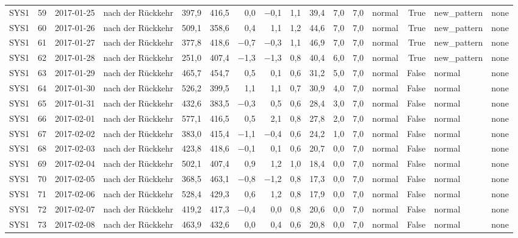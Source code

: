 \begin{tabular}{lrllrrrrrrrrlrll}
SYS1 & 59 & 2017-01-25 & nach der Rückkehr & 397,9 & 416,5 & 0,0 & $-$0,1 & 1,1 & 39,4 & 7,0 & 7,0 & normal & True & new\_pattern & none \\
SYS1 & 60 & 2017-01-26 & nach der Rückkehr & 509,1 & 358,6 & 0,4 & 1,1 & 1,2 & 44,6 & 7,0 & 7,0 & normal & True & new\_pattern & none \\
SYS1 & 61 & 2017-01-27 & nach der Rückkehr & 377,8 & 418,6 & $-$0,7 & $-$0,3 & 1,1 & 46,9 & 7,0 & 7,0 & normal & True & new\_pattern & none \\
SYS1 & 62 & 2017-01-28 & nach der Rückkehr & 251,0 & 407,4 & $-$1,3 & $-$1,3 & 0,8 & 40,4 & 6,0 & 7,0 & normal & True & new\_pattern & none \\
SYS1 & 63 & 2017-01-29 & nach der Rückkehr & 465,7 & 454,7 & 0,5 & 0,1 & 0,6 & 31,2 & 5,0 & 7,0 & normal & False & normal & none \\
SYS1 & 64 & 2017-01-30 & nach der Rückkehr & 526,2 & 399,5 & 1,1 & 1,1 & 0,7 & 30,9 & 4,0 & 7,0 & normal & False & normal & none \\
SYS1 & 65 & 2017-01-31 & nach der Rückkehr & 432,6 & 383,5 & $-$0,3 & 0,5 & 0,6 & 28,4 & 3,0 & 7,0 & normal & False & normal & none \\
SYS1 & 66 & 2017-02-01 & nach der Rückkehr & 577,1 & 416,5 & 0,5 & 2,1 & 0,8 & 27,8 & 2,0 & 7,0 & normal & False & normal & none \\
SYS1 & 67 & 2017-02-02 & nach der Rückkehr & 383,0 & 415,4 & $-$1,1 & $-$0,4 & 0,6 & 24,2 & 1,0 & 7,0 & normal & False & normal & none \\
SYS1 & 68 & 2017-02-03 & nach der Rückkehr & 423,8 & 418,6 & $-$0,1 & 0,1 & 0,6 & 20,7 & 0,0 & 7,0 & normal & False & normal & none \\
SYS1 & 69 & 2017-02-04 & nach der Rückkehr & 502,1 & 407,4 & 0,9 & 1,2 & 1,0 & 18,4 & 0,0 & 7,0 & normal & False & normal & none \\
SYS1 & 70 & 2017-02-05 & nach der Rückkehr & 368,5 & 463,1 & $-$0,8 & $-$1,2 & 0,8 & 17,3 & 0,0 & 7,0 & normal & False & normal & none \\
SYS1 & 71 & 2017-02-06 & nach der Rückkehr & 528,4 & 429,3 & 0,6 & 1,2 & 0,8 & 17,9 & 0,0 & 7,0 & normal & False & normal & none \\
SYS1 & 72 & 2017-02-07 & nach der Rückkehr & 419,2 & 417,3 & $-$0,4 & 0,0 & 0,8 & 20,6 & 0,0 & 7,0 & normal & False & normal & none \\
SYS1 & 73 & 2017-02-08 & nach der Rückkehr & 463,9 & 432,6 & 0,0 & 0,4 & 0,6 & 20,8 & 0,0 & 7,0 & normal & False & normal & none \\

\end{tabular}
